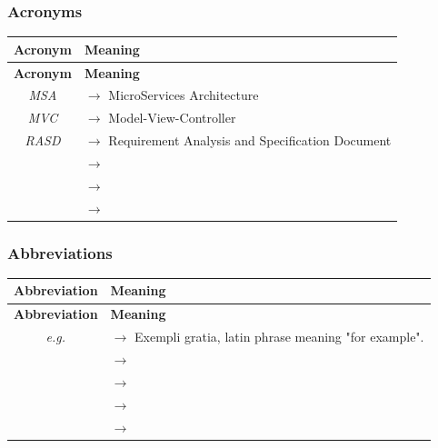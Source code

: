 \documentclass{article}
\begin{document}
{        \subsubsection{Acronyms}
            \begin{xltabular}{\textwidth}{ >{\raggedright\arraybackslash}c >{\raggedright\arraybackslash}X }
                \hline
                \textbf{Acronym} & \textbf{Meaning} \\
                \hline

                \endfirsthead

                \hline
                \textbf{Acronym} & \textbf{Meaning} \\
                \hline

                \endhead
                \endfoot
                \endlastfoot

                \textit{MSA} & $\rightarrow$ MicroServices Architecture\\
                \textit{MVC} & $\rightarrow$ Model-View-Controller\\
                \textit{RASD} & $\rightarrow$ Requirement Analysis and Specification Document\\
                \textit{} & $\rightarrow$ \\
                \textit{} & $\rightarrow$ \\
                \textit{} & $\rightarrow$ \\
            \end{xltabular}


        \subsubsection{Abbreviations}
            \begin{xltabular}{\textwidth}{ >{\raggedright\arraybackslash}c >{\raggedright\arraybackslash}X }
                \hline
                \textbf{Abbreviation} & \textbf{Meaning} \\
                \hline

                \endfirsthead

                \hline
                \textbf{Abbreviation} & \textbf{Meaning} \\
                \hline

                \endhead
                \endfoot
                \endlastfoot

                \textit{e.g.} & $\rightarrow$ Exempli gratia, latin phrase meaning "for example".
                \\
                \textit{} & $\rightarrow$ 
                \\
                \textit{} & $\rightarrow$ 
                \\
                \textit{} & $\rightarrow$ 
                \\
                \textit{} & $\rightarrow$ 
                \\
            \end{xltabular}
}
\end{document}
